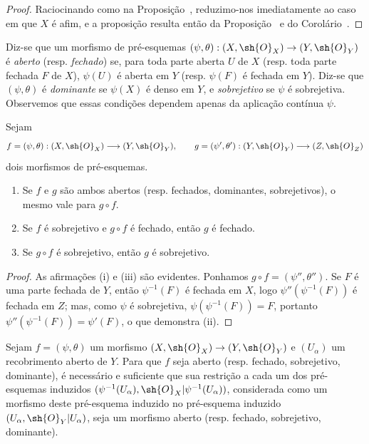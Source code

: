 \documentclass[oneside]{amsart}
\makeatletter
\newcommand{\ega@arrow}[2]{\mathchoice{#1}{#2}{#2}{#2}}
\renewcommand{\to}{\ega@arrow{\longrightarrow}{\rightarrow}}
\let\EGAOriginalLabel\label
\renewcommand{\label}[1]{\phantomsection\EGAOriginalLabel{#1}}
\makeatother
\begin{document}
\begin{proof}
Raciocinando como na Proposição~, reduzimo-nos imediatamente
ao caso em que $X$ é afim, e a proposição resulta então da
Proposição~ e do Corolário~.
\end{proof}

\begin{env}[2.2.6]
\label{I.2.2.6}
Diz-se que um morfismo de pré-esquemas
$(\psi,\theta):(X,\sh{O}_X)\to(Y,\sh{O}_Y)$ é \emph{aberto}
(resp. \emph{fechado}) se, para toda parte aberta $U$ de $X$
(resp. toda parte fechada $F$ de $X$), $\psi(U)$ é aberta em $Y$
(resp. $\psi(F)$ é fechada em $Y$).
Diz-se que $(\psi,\theta)$ é \emph{dominante} se $\psi(X)$ é denso em $Y$,
e \emph{sobrejetivo} se $\psi$ é sobrejetiva.
Observemos que essas condições dependem apenas da aplicação contínua $\psi$.
\end{env}

\begin{proposition}[2.2.7]
\label{I.2.2.7}
Sejam
\[
  f=(\psi,\theta):(X,\sh{O}_X)\to(Y,\sh{O}_Y),
  \qquad
  g=(\psi',\theta'):(Y,\sh{O}_Y)\to(Z,\sh{O}_Z)
\]
dois morfismos de pré-esquemas.
\begin{enumerate}
  \item[\rm(i)] Se $f$ e $g$ são ambos abertos (resp. fechados, dominantes,
    sobrejetivos), o mesmo vale para $g\circ f$.
  \item[\rm(ii)] Se $f$ é sobrejetivo e $g\circ f$ é fechado, então $g$ é
    fechado.
  \item[\rm(iii)] Se $g\circ f$ é sobrejetivo, então $g$ é sobrejetivo.
\end{enumerate}
\end{proposition}

\begin{proof}
As afirmações (i) e (iii) são evidentes.
Ponhamos $g\circ f=(\psi'',\theta'')$.
Se $F$ é uma parte fechada de $Y$, então $\psi^{-1}(F)$ é fechada em $X$,
logo $\psi''(\psi^{-1}(F))$ é fechada em $Z$; mas, como $\psi$ é
sobrejetiva, $\psi(\psi^{-1}(F))=F$, portanto
$\psi''(\psi^{-1}(F))=\psi'(F)$, o que demonstra (ii).
\end{proof}

\begin{proposition}[2.2.8]
\label{I.2.2.8}
Sejam $f=(\psi,\theta)$ um morfismo
$(X,\sh{O}_X)\to(Y,\sh{O}_Y)$ e $(U_\alpha)$ um recobrimento aberto de $Y$.
Para que $f$ seja aberto (resp. fechado, sobrejetivo, dominante), é
necessário e suficiente que sua restrição a cada um dos pré-esquemas induzidos
$(\psi^{-1}(U_\alpha),\sh{O}_X|\psi^{-1}(U_\alpha))$, considerada como um
morfismo deste pré-esquema induzido no pré-esquema induzido
$(U_\alpha,\sh{O}_Y|U_\alpha)$, seja um morfismo aberto
(resp. fechado, sobrejetivo, dominante).
\end{proposition}
\end{document}
